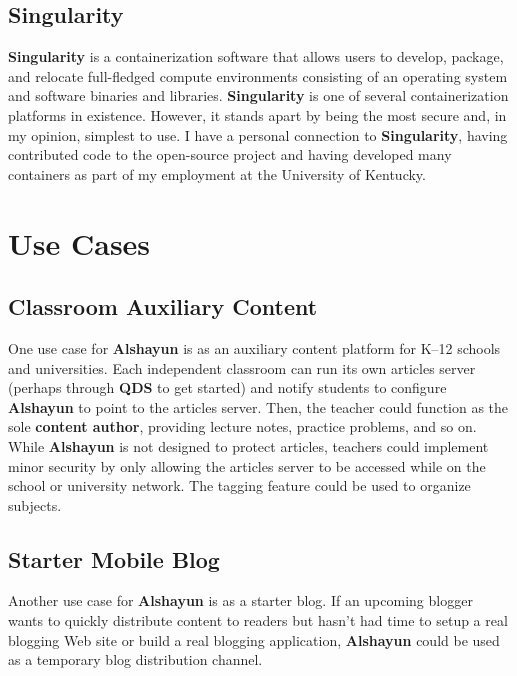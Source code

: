 \documentclass[12pt]{report}
\begin{document}
    \section{Singularity}

\textbf{Singularity} \cite{singularity} is a containerization software that
allows users to develop, package, and relocate full-fledged compute environments
consisting of an operating system and software binaries and libraries.
\textbf{Singularity} is one of several containerization platforms in existence.
However, it stands apart by being the most secure and, in my opinion, simplest
to use. I have a personal connection to \textbf{Singularity}, having contributed
code to the open-source project and having developed many containers as part of
my employment at the University of Kentucky.

\chapter{Use Cases}

    \section{Classroom Auxiliary Content}

One use case for \textbf{Alshayun} is as an auxiliary content platform for K--12
schools and universities. Each independent classroom can run its own articles
server (perhaps through \textbf{QDS} to get started) and notify students to
configure \textbf{Alshayun} to point to the articles server. Then, the teacher
could function as the sole \textbf{content author}, providing lecture notes,
practice problems, and so on. While \textbf{Alshayun} is not designed to protect
articles, teachers could implement minor security by only allowing the articles
server to be accessed while on the school or university network. The tagging
feature could be used to organize subjects.

    \section{Starter Mobile Blog}

Another use case for \textbf{Alshayun} is as a starter blog. If an upcoming
blogger wants to quickly distribute content to readers but hasn't had time to
setup a real blogging Web site or build a real blogging application,
\textbf{Alshayun} could be used as a temporary blog distribution channel.
\end{document}
